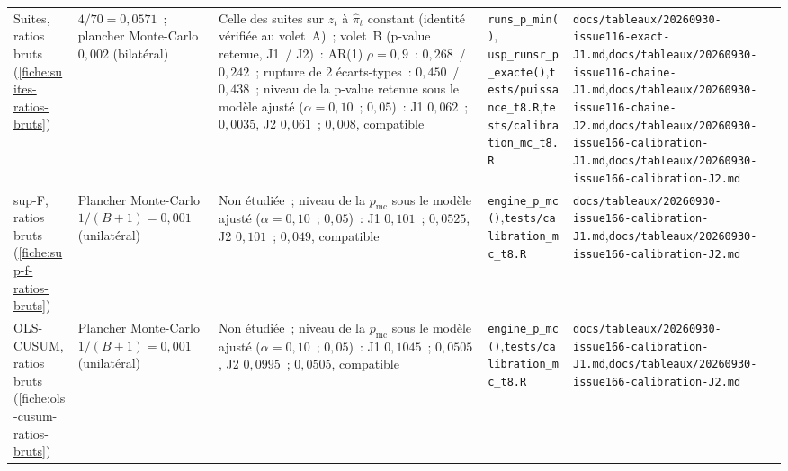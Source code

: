 \documentclass[a4paper,11pt]{article}
\newcommand{\code}[1]{\texttt{\small #1}}
\begin{document}
\begin{landscape}
\begin{center}
\begin{longtable}{@{}>{\raggedright\arraybackslash}p{2.5cm}>{\raggedright\arraybackslash}p{3.6cm}>{\raggedright\arraybackslash}p{4.0cm}>{\raggedright\arraybackslash}p{6.7cm}>{\raggedright\arraybackslash}p{7.2cm}@{}}
Suites, ratios bruts (\ref{fiche:suites-ratios-bruts}) & $4/70 = 0{,}0571$~; plancher Monte-Carlo $0{,}002$ (bilatéral) & Celle des suites sur $z_t$ à $\hat\pi_t$ constant (identité vérifiée au volet~A)~; volet~B (p-value retenue, J1~/ J2)~: AR(1) $\rho = 0{,}9$~: $0{,}268$~/ $0{,}242$~; rupture de 2 écarts-types~: $0{,}450$~/ $0{,}438$~; niveau de la p-value retenue sous le modèle ajusté ($\alpha = 0{,}10$~; $0{,}05$)~: J1 $0{,}062$~; $0{,}0035$, J2 $0{,}061$~; $0{,}008$, compatible & \code{runs\_p\_min()}, \code{usp\_runsr\_p\_exacte()},\newline \code{tests/puissance\_t8.R},\newline \code{tests/calibration\_mc\_t8.R} & \code{docs/tableaux/}\newline \code{20260930-issue116-exact-J1.md},\newline \code{docs/tableaux/}\newline \code{20260930-issue116-chaine-J1.md},\newline \code{docs/tableaux/}\newline \code{20260930-issue116-chaine-J2.md},\newline \code{docs/tableaux/}\newline \code{20260930-issue166-calibration-J1.md},\newline \code{docs/tableaux/}\newline \code{20260930-issue166-calibration-J2.md} \\
sup-F, ratios bruts (\ref{fiche:sup-f-ratios-bruts}) & Plancher Monte-Carlo $1/(B+1) = 0{,}001$ (unilatéral) & Non étudiée~; niveau de la $p_{\mathrm{mc}}$ sous le modèle ajusté ($\alpha = 0{,}10$~; $0{,}05$)~: J1 $0{,}101$~; $0{,}0525$, J2 $0{,}101$~; $0{,}049$, compatible & \code{engine\_p\_mc()},\newline \code{tests/calibration\_mc\_t8.R} & \code{docs/tableaux/}\newline \code{20260930-issue166-calibration-J1.md},\newline \code{docs/tableaux/}\newline \code{20260930-issue166-calibration-J2.md} \\
OLS-CUSUM, ratios bruts (\ref{fiche:ols-cusum-ratios-bruts}) & Plancher Monte-Carlo $1/(B+1) = 0{,}001$ (unilatéral) & Non étudiée~; niveau de la $p_{\mathrm{mc}}$ sous le modèle ajusté ($\alpha = 0{,}10$~; $0{,}05$)~: J1 $0{,}1045$~; $0{,}0505$, J2 $0{,}0995$~; $0{,}0505$, compatible & \code{engine\_p\_mc()},\newline \code{tests/calibration\_mc\_t8.R} & \code{docs/tableaux/}\newline \code{20260930-issue166-calibration-J1.md},\newline \code{docs/tableaux/}\newline \code{20260930-issue166-calibration-J2.md} \\

\end{longtable}
\end{center}
\end{landscape}
\end{document}
